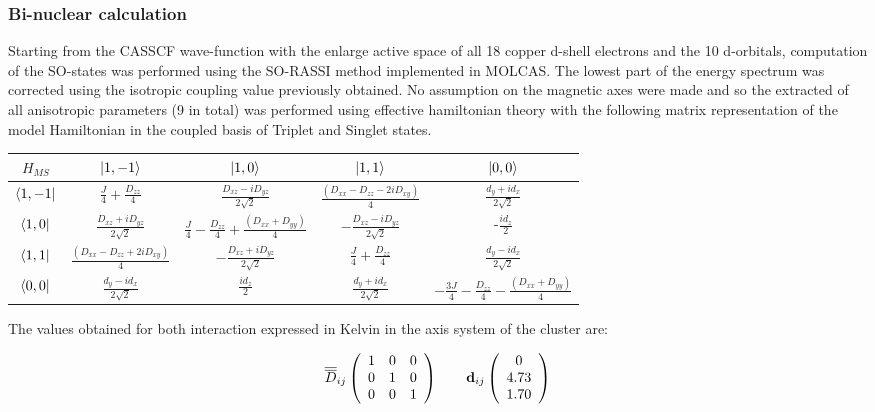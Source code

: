 \documentclass[10pt]{report}
\numberwithin{equation}{section}
\begin{document}
\subsubsection*{Bi-nuclear calculation}

Starting from the CASSCF wave-function with the enlarge active space of all 18 copper d-shell electrons and the 10 d-orbitals, computation of the SO-states was performed using the SO-RASSI method implemented in MOLCAS.
The lowest part of the energy spectrum was corrected using the isotropic coupling value previously obtained.
No assumption on the magnetic axes were made and so the extracted of all anisotropic parameters (9 in total) was performed using effective hamiltonian theory with the following matrix representation of the model Hamiltonian in the coupled basis of Triplet and Singlet states.

\begin{center}
    \begin{tabular}{c | c c c c}
        $H_{MS}$ & $\ket{1,-1}$ & $\ket{1,0}$ & $\ket{1,1}$ & $\ket{0,0}$\\
        \hline
        $\bra{1,-1}$ & $\frac{J}{4}+\frac{D_{zz}}{4}$ & $\frac{D_{xz}-iD_{yz}}{2\sqrt{2}}$ & $\frac{(D_{xx}-D_{zz}-2iD_{xy})}{4} $& $\frac{d_y+id_x}{2\sqrt{2}}$\\
        $\bra{1,0}$ & $\frac{D_{xz}+iD_{yz}}{2\sqrt{2}}$ &$ \frac{J}{4} -\frac{D_{zz}}{4} +\frac{(D_{xx}+D_{yy})}{4}$& $-\frac{D_{xz}-iD_{yz}}{2\sqrt{2}}$ & -$\frac{id_z}{2}$ \\
        $\bra{1,1}$ &$\frac{(D_{xx}-D_{zz}+2iD_{xy})}{4} $ & $-\frac{D_{xz}+iD_{yz}}{2\sqrt{2}}$ & $\frac{J}{4}+\frac{D_{zz}}{4}$ & $\frac{d_y-id_x}{2\sqrt{2}}$\\
        $\bra{0,0}$ & $\frac{d_y-id_x}{2\sqrt{2}}$  & $\frac{id_z}{2}$  &$\frac{d_y+id_x}{2\sqrt{2}}$  & $-\frac{3J}{4}-\frac{D_{zz}}{4}-\frac{(D_{xx}+D_{yy})}{4}$\\
    \end{tabular}
\end{center}

The values obtained for both interaction expressed in Kelvin in the axis system of the cluster are:

\[ \overline{\overline{D}}_{ij} \left( \begin{array}{c c c}
    1 & 0 & 0\\
    0 & 1 & 0\\
    0 & 0 & 1
    \end{array} \right)
    \qquad
    \vb{d}_{ij}
    \left( \begin{array}{c}
    0  \\
    4.73  \\
    1.70
    \end{array} \right)
    \]
    
\end{document}
